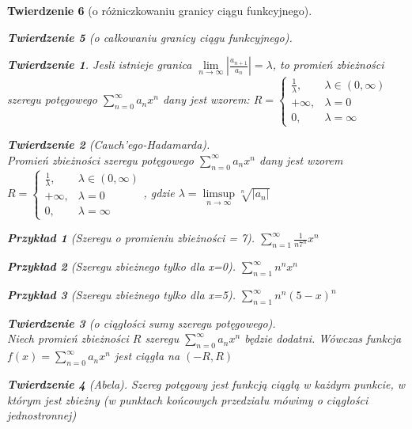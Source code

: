 \documentclass[12pt,a4paper]{article}
\newtheorem{tw}{Twierdzenie}
\newtheorem{przyklad}{Przykład}
\theoremstyle{definition}
\begin{document}
\begin{tw}[o różniczkowaniu granicy ciągu funkcyjnego]
\begin{tw}[o całkowaniu granicy ciągu funkcyjnego]
\begin{tw}
Jesli istnieje granica $\lim\limits_{n\to\infty} |\frac{a_{n+1}}{a_n}| = \lambda $, to promień zbieżności szeregu potęgowego $\sum\limits_{n=0}^\infty a_nx^n$ dany jest wzorem:
$ R = 
	\begin{cases}
		\frac{1}{\lambda}, & \lambda \in (0,\infty)\\
		+\infty, & \lambda = 0\\
		0, & \lambda = \infty
	\end{cases} $
\end{tw}

\begin{tw}[Cauch'ego-Hadamarda]~\\
Promień zbieżności szeregu potęgowego $\sum\limits_{n=0}^\infty a_nx^n$ dany jest wzorem 
$ R = 
	\begin{cases}
		\frac{1}{\lambda}, & \lambda \in (0,\infty)\\
		+\infty, & \lambda = 0\\
		0, & \lambda = \infty
	\end{cases} $, gdzie $\lambda = \limsup\limits_{n\to\infty}\sqrt[n]{|a_n|}$
\end{tw}

\begin{przyklad}[Szeregu o promieniu zbieżności = 7]
$\sum\limits_{n=1}^\infty \frac{1}{n7^n}x^n$
\end{przyklad}
\begin{przyklad}[Szeregu zbieżnego tylko dla x=0]
$\sum\limits_{n=1}^\infty n^nx^n$
\end{przyklad}
\begin{przyklad}[Szeregu zbieżnego tylko dla x=5]
$\sum\limits_{n=1}^\infty n^n(5-x)^n$
\end{przyklad}

\begin{tw}[o ciągłości sumy szeregu potęgowego]~\\
Niech promień zbieżności $R$ szeregu $\sum\limits_{n=0}^\infty a_nx^n$ będzie dodatni. Wówczas funkcja $f(x)=\sum\limits_{n=0}^\infty a_nx^n$ jest ciągła na $(-R, R)$
\end{tw}

\begin{tw}[Abela]
Szereg potęgowy jest funkcją ciągłą w każdym punkcie, w którym jest zbieżny (w punktach końcowych przedziału mówimy o ciągłości jednostronnej) 
\end{tw}


\end{tw}
\end{tw}
\end{document}
